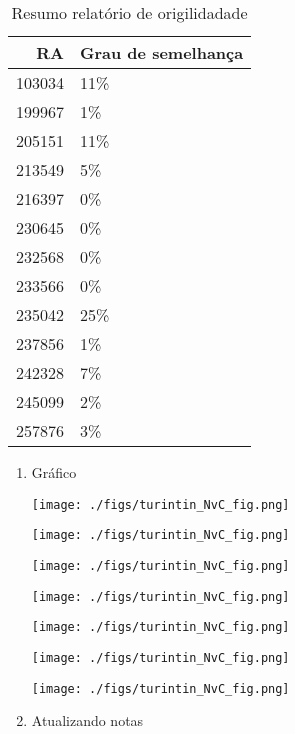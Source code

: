 \documentclass[11pt]{article}
\begin{document}
\begin{table}[htbp]
\caption{\label{TurnitinNvC}Resumo relatório de origilidadade}
\centering
\begin{tabular}{rl}
\hline
RA & Grau de semelhança\\
\hline
103034 & 11\%\\
199967 & 1\%\\
205151 & 11\%\\
213549 & 5\%\\
216397 & 0\%\\
230645 & 0\%\\
232568 & 0\%\\
233566 & 0\%\\
235042 & 25\%\\
237856 & 1\%\\
242328 & 7\%\\
245099 & 2\%\\
257876 & 3\%\\
\hline
\end{tabular}
\end{table}

\begin{enumerate}
\item Gráfico
\label{sec:orgc2247b5}
\begin{center}
\texttt{[image: ./figs/turintin\_NvC\_fig.png]}
\end{center}
\begin{center}
\texttt{[image: ./figs/turintin\_NvC\_fig.png]}
\end{center}
\begin{center}
\texttt{[image: ./figs/turintin\_NvC\_fig.png]}
\end{center}
\begin{center}
\texttt{[image: ./figs/turintin\_NvC\_fig.png]}
\end{center}
\begin{center}
\texttt{[image: ./figs/turintin\_NvC\_fig.png]}
\end{center}
\begin{center}
\texttt{[image: ./figs/turintin\_NvC\_fig.png]}
\end{center}
\begin{center}
\texttt{[image: ./figs/turintin\_NvC\_fig.png]}
\end{center}

\item Atualizando notas
\label{sec:org005f6ba}
\end{enumerate}
\end{document}
